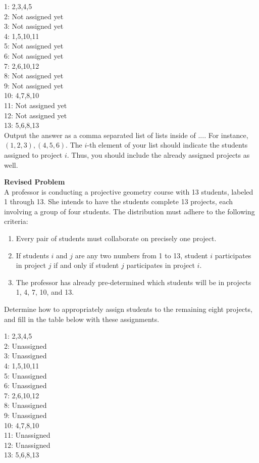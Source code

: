 1: 2,3,4,5 \\
2: Not assigned yet \\
3: Not assigned yet \\
4: 1,5,10,11 \\
5: Not assigned yet \\
6: Not assigned yet \\
7: 2,6,10,12 \\
8: Not assigned yet \\
9: Not assigned yet \\
10: 4,7,8,10 \\
11: Not assigned yet \\
12: Not assigned yet \\
13: 5,6,8,13 \\

Output the answer as a comma separated list of lists inside of $\boxed{...}$. For instance, $\boxed{(1,2,3),(4,5,6)}$. The $i$-th element of your list should indicate the students assigned to project $i$. Thus, you should include the already assigned projects as well.

\textbf{Revised Problem}\\
A professor is conducting a projective geometry course with 13 students, labeled 1 through 13. She intends to have the students complete 13 projects, each involving a group of four students. The distribution must adhere to the following criteria:

\begin{enumerate}
    \item Every pair of students must collaborate on precisely one project.
    \item If students $i$ and $j$ are any two numbers from 1 to 13, student $i$ participates in project $j$ if and only if student $j$ participates in project $i$.
    \item The professor has already pre-determined which students will be in projects 1, 4, 7, 10, and 13.
\end{enumerate}

Determine how to appropriately assign students to the remaining eight projects, and fill in the table below with these assignments.

1: 2,3,4,5 \\
2: Unassigned \\
3: Unassigned \\
4: 1,5,10,11 \\
5: Unassigned \\
6: Unassigned \\
7: 2,6,10,12 \\
8: Unassigned \\
9: Unassigned \\
10: 4,7,8,10 \\
11: Unassigned \\
12: Unassigned \\
13: 5,6,8,13 \\

